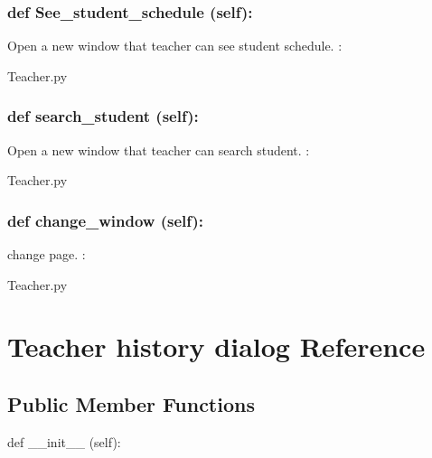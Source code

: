 \hypertarget{class_poly_a14a7ad77ce612b0c54f531d307ee4b39}{
\subsubsection[{def See_student_schedule (self):}]{\setlength{\rightskip}{0pt plus 5cm}def {See\_student\_schedule} (self):}}\label{class_poly_a14a7ad77ce612b0c54f531d307ee4b39}
Open a new window that teacher can see student schedule.
:\begin{DoxyCompactItemize}
\item 
Teacher.\-py\end{DoxyCompactItemize}

\hypertarget{class_poly_a14a7ad77ce612b0c54f531d307ee4b39}{
\subsubsection[{def search_student (self):}]{\setlength{\rightskip}{0pt plus 5cm}def {search\_student} (self):}}\label{class_poly_a14a7ad77ce612b0c54f531d307ee4b39}
Open a new window that teacher can search student.
:\begin{DoxyCompactItemize}
\item 
Teacher.\-py\end{DoxyCompactItemize}

\hypertarget{class_poly_a14a7ad77ce612b0c54f531d307ee4b39}{
\subsubsection[{def change_window (self):}]{\setlength{\rightskip}{0pt plus 5cm}def {change\_window} (self):}}\label{class_poly_a14a7ad77ce612b0c54f531d307ee4b39}
change page.
:\begin{DoxyCompactItemize}
\item 
Teacher.\-py\end{DoxyCompactItemize}


\hypertarget{Teacher_history_dialog}{\section{Teacher history dialog Reference}
\label{Teacher_history_dialog}
}
\subsection*{Public Member Functions}
\begin{DoxyCompactItemize}
\item 
def {\_\_init\_\_} (self):

\end{DoxyCompactItemize}

